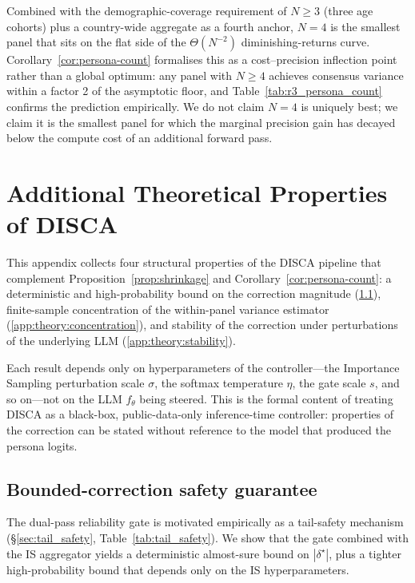 \documentclass{article}
\begin{document}
Combined with the demographic-coverage requirement of $N \geq 3$ (three age cohorts) plus a country-wide aggregate as a fourth anchor, $N{=}4$ is the smallest panel that sits on the flat side of the $\Theta(N^{-2})$ diminishing-returns curve. Corollary~\ref{cor:persona-count} formalises this as a cost--precision inflection point rather than a global optimum: any panel with $N \geq 4$ achieves consensus variance within a factor 2 of the asymptotic floor, and Table~\ref{tab:r3_persona_count} confirms the prediction empirically. We do not claim $N{=}4$ is uniquely best; we claim it is the smallest panel for which the marginal precision gain has decayed below the compute cost of an additional forward pass.

\section{Additional Theoretical Properties of DISCA}
\label{app:theory-additional}

This appendix collects four structural properties of the DISCA pipeline that complement Proposition~\ref{prop:shrinkage} and Corollary~\ref{cor:persona-count}: a deterministic and high-probability bound on the correction magnitude (\ref{app:theory:bounded}), finite-sample concentration of the within-panel variance estimator (\ref{app:theory:concentration}), and stability of the correction under perturbations of the underlying LLM (\ref{app:theory:stability}).

Each result depends only on hyperparameters of the controller---the Importance Sampling perturbation scale $\sigma$, the softmax temperature $\eta$, the gate scale $s$, and so on---not on the LLM $f_\theta$ being steered. This is the formal content of treating DISCA as a black-box, public-data-only inference-time controller: properties of the correction can be stated without reference to the model that produced the persona logits.


\subsection{Bounded-correction safety guarantee}
\label{app:theory:bounded}

The dual-pass reliability gate is motivated empirically as a tail-safety mechanism (\S\ref{sec:tail_safety}, Table~\ref{tab:tail_safety}). We show that the gate combined with the IS aggregator yields a deterministic almost-sure bound on $|\delta^\star|$, plus a tighter high-probability bound that depends only on the IS hyperparameters.
\end{document}
